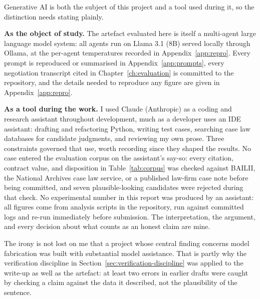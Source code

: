 Generative AI is both the subject of this project and a tool used during it, so
the distinction needs stating plainly.

\textbf{As the object of study.} The artefact evaluated here is itself a
multi-agent large language model system: all agents run on Llama 3.1 (8B) served
locally through Ollama, at the per-agent temperatures recorded in
Appendix~\ref{app:repro}. Every prompt is reproduced or summarised in
Appendix~\ref{app:prompts}, every negotiation transcript cited in
Chapter~\ref{ch:evaluation} is committed to the repository, and the details
needed to reproduce any figure are given in Appendix~\ref{app:repro}.

\textbf{As a tool during the work.} I used Claude (Anthropic) as a coding and
research assistant throughout development, much as a developer uses an IDE
assistant: drafting and refactoring Python, writing test cases, searching case
law databases for candidate judgments, and reviewing my own prose. Three
constraints governed that use, worth recording since they shaped the results.
No case entered the evaluation corpus on the assistant's say-so: every
citation, contract value, and disposition in Table~\ref{tab:corpus} was
checked against BAILII, the National Archives case law service, or a
published law-firm case note before being committed, and seven
plausible-looking candidates were rejected during that check. No experimental
number in this report was produced by an assistant: all figures come from
analysis scripts in the repository, run against committed logs and re-run
immediately before submission. The interpretation, the argument, and every
decision about what counts as an honest claim are mine.

The irony is not lost on me that a project whose central finding concerns
model fabrication was built with substantial model assistance. That is
partly why the verification discipline in
Section~\ref{sec:verification-discipline} was applied to the write-up as
well as the artefact: at least two errors in earlier drafts were caught by
checking a claim against the data it described, not the plausibility of the
sentence.
